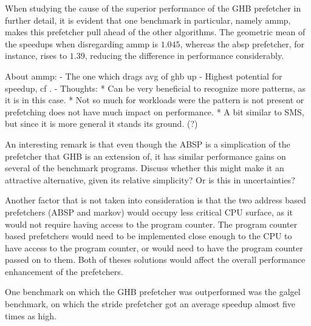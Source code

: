 
When studying the cause of the superior performance of the GHB
prefetcher in further detail, it is evident that one benchmark in
particular, namely ammp, makes this prefetcher pull ahead of the other
algorithms. The geometric mean of the speedups when disregarding ammp
is $1.045$, whereas the absp prefetcher, for instance, rises to
$1.39$, reducing the difference in performance considerably.

About ammp:
- The one which drags avg of ghb up
- Highest potential for speedup, cf \cite{Nesbit}.
- Thoughts:
  * Can be very beneficial to recognize more patterns, as it is in this case.
  * Not so much for workloads were the pattern is not present or
    prefetching does not have much impact on performance.
  * A bit similar to SMS, but since it is more general it stands its ground. (?)


An interesting remark is that even though the ABSP is a simplication
of the prefetcher that GHB is an extension of, it has similar
performance gains on several of the benchmark programs. Discuss
whether this might make it an attractive alternative, given its
relative simplicity? Or is this in uncertainties?

Another factor that is not taken into consideration is that the two address based prefetchers (ABSP and markov) would occupy less critical CPU surface, as it would not require having access to the program counter. The program counter based prefetchers would need to be implemented close enough to the CPU to have access to the program counter, or would need to have the program counter passed on to them. Both of theses solutions would affect the overall performance enhancement of the prefetchers. 


One benchmark on which the GHB prefetcher was outperformed was the
galgel benchmark, on which the stride prefetcher got an average
speedup almost five times as high.




